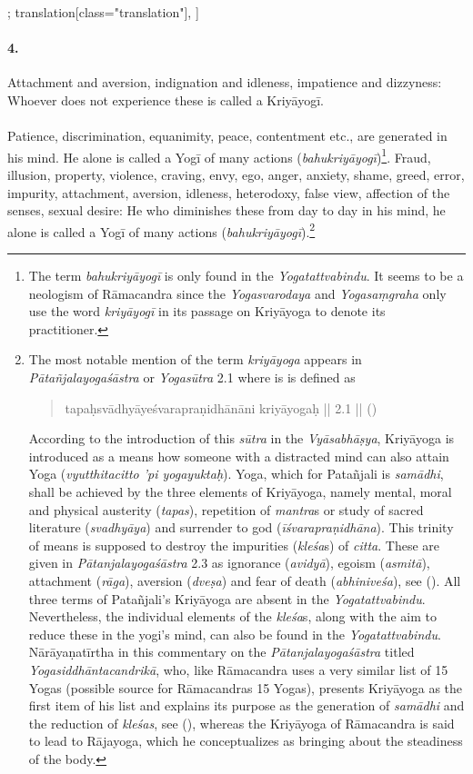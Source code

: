 \begin{alignment}[
    texts=edition[class="edition"];
    translation[class="translation"],
  ]
\begin{translation}
\begin{tlate}
\paragraph{4.} Attachment and aversion, indignation and idleness, impatience and dizzyness: Whoever does not experience these is called a Kriyāyogī.
\\\\
Patience, discrimination, equanimity, peace, contentment etc., are generated in his mind. He alone is called a Yogī of many actions (\textit{bahukriyāyogī})\footnote{The term \textit{bahukriyāyogī} is only found in the \textit{Yogatattvabindu}. It seems to be a neologism of Rāmacandra since the \textit{Yogasvarodaya} and \textit{Yogasaṃgraha} only use the word \textit{kriyāyogī} in its passage on Kriyāyoga to denote its practitioner.}. Fraud, illusion, property, violence, craving, envy, ego, anger, anxiety, shame, greed, error, impurity, attachment, aversion, idleness, heterodoxy, false view, affection of the senses, sexual desire: He who diminishes these from day to day in his mind, he alone is called a Yogī of many actions (\textit{bahukriyāyogī}).\footnote{The most notable mention of the term \textit{kriyāyoga} appears in \textit{Pātañjalayogaśāstra} or \textit{Yogasūtra} 2.1 where is is defined as  
\begin{quote}
tapaḥsvādhyāyeśvarapraṇidhānāni kriyāyogaḥ || 2.1 || (\citeauthor[1983:113]{yogasutra})
\end{quote}
According to the introduction of this \textit{sūtra} in the \textit{Vyāsabhāṣya}, Kriyāyoga is introduced as a means how someone with a distracted mind can also attain Yoga (\textit{vyutthitacitto 'pi yogayuktaḥ}). Yoga, which for Patañjali is \textit{samādhi}, shall be achieved by the three elements of Kriyāyoga, namely mental, moral and physical austerity (\textit{tapas}), repetition of \textit{mantra}s or study of sacred literature (\textit{svadhyāya}) and surrender to god (\textit{īśvarapraṇidhāna}). This trinity of means is supposed to destroy the impurities (\textit{kleśa}s) of \textit{citta}. These are given in \textit{Pātanjalayogaśāstra} 2.3 as ignorance (\textit{avidyā}), egoism (\textit{asmitā}), attachment (\textit{rāga}), aversion (\textit{dveṣa}) and fear of death (\textit{abhiniveśa}), see (\citeauthor[1983:116]{yogasutra}). All three terms of Patañjali's Kriyāyoga are absent in the \textit{Yogatattvabindu}. Nevertheless, the individual elements of the \textit{kleśa}s, along with the aim to reduce these in the yogi's mind, can also be found in the \textit{Yogatattvabindu}. Nārāyaṇatīrtha in this commentary on the \textit{Pātanjalayogaśāstra} titled \textit{Yogasiddhāntacandrikā}, who, like Rāmacandra uses a very similar list of 15 Yogas (possible source for Rāmacandras 15 Yogas), presents Kriyāyoga as the first item of his list and explains its purpose as the generation of \textit{samādhi} and the reduction of \textit{kleśas}, see (\citeauthor[2000:71]{yogacandrika}), whereas the Kriyāyoga of Rāmacandra is said to lead to Rājayoga, which he conceptualizes as bringing about the steadiness of the body.}

\end{tlate}
\end{translation}
\end{alignment}
